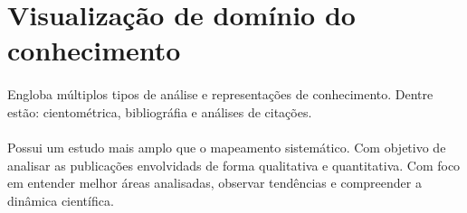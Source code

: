 \section{Visualização de domínio do conhecimento}

\paragraph{}
Engloba múltiplos tipos de análise e representações de conhecimento. Dentre estão: cientométrica, bibliográfia e análises de citações.

\paragraph{}
Possui um estudo mais amplo que o mapeamento sistemático. Com objetivo de analisar as publicações envolvidads de forma qualitativa e quantitativa. Com foco em entender melhor áreas analisadas, observar tendências e compreender a dinâmica científica.